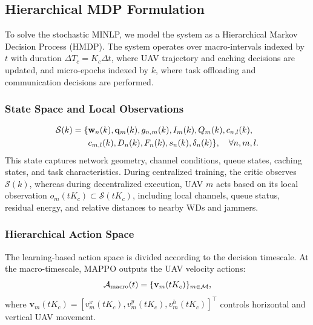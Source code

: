 \documentclass[journal]{IEEEtran}
\begin{document}


\subsection{Hierarchical MDP Formulation}

To solve the stochastic MINLP, we model the system as a Hierarchical Markov Decision Process (HMDP). The system operates over macro-intervals indexed by $t$ with duration $\Delta T_c=K_c\Delta t$, where UAV trajectory and caching decisions are updated, and micro-epochs indexed by $k$, where task offloading and communication decisions are performed.

\subsubsection{State Space and Local Observations}

\begin{align}
\small
\mathcal{S}(k)=\{&
\mathbf{w}_n(k),\mathbf{q}_m(k),g_{n,m}(k),I_m(k),Q_m(k),
c_{n,l}(k), \nonumber\\
&c_{m,l}(k),D_n(k),F_n(k),s_n(k),\delta_n(k)\},
\quad \forall n,m,l .
\end{align}
This state captures network geometry, channel conditions, queue states, caching states, and task characteristics. During centralized training, the critic observes $\mathcal{S}(k)$, whereas during decentralized execution, UAV $m$ acts based on its local observation $o_m(tK_c)\subset\mathcal{S}(tK_c)$, including local channels, queue status, residual energy, and relative distances to nearby WDs and jammers.

\subsubsection{Hierarchical Action Space}

The learning-based action space is divided according to the decision timescale. At the macro-timescale, MAPPO outputs the UAV velocity actions:
\begin{equation}
\small
\mathcal{A}_{\mathrm{macro}}(t)=\{\mathbf{v}_m(tK_c)\}_{m\in\mathcal{M}},
\end{equation}
where $\mathbf{v}_m(tK_c)=[v_m^x(tK_c),v_m^y(tK_c),v_m^h(tK_c)]^\top$ controls horizontal and vertical UAV movement.
\end{document}

